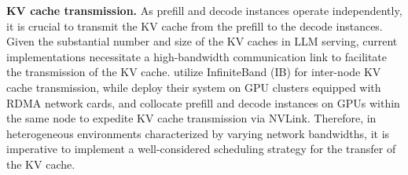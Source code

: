 \textbf{KV cache transmission.} As prefill and decode instances operate independently, it is crucial to transmit the KV cache from the prefill to the decode instances. Given the substantial number and size of the KV caches in LLM serving, current implementations necessitate a high-bandwidth communication link to facilitate the transmission of the KV cache. \cite{patel2024splitwise} utilize InfiniteBand (IB) for inter-node KV cache transmission, while \cite{qin2024mooncake} deploy their system on GPU clusters equipped with RDMA network cards, and \cite{zhong2024distserve} collocate prefill and decode instances on GPUs within the same node to expedite KV cache transmission via NVLink. Therefore, in heterogeneous environments characterized by varying network bandwidths, it is imperative to implement a well-considered scheduling strategy for the transfer of the KV cache.